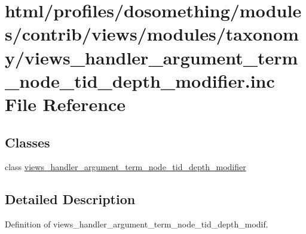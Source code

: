 \hypertarget{views__handler__argument__term__node__tid__depth__modifier_8inc}{
\section{html/profiles/dosomething/modules/contrib/views/modules/taxonomy/views\_\-handler\_\-argument\_\-term\_\-node\_\-tid\_\-depth\_\-modifier.inc File Reference}
\label{views__handler__argument__term__node__tid__depth__modifier_8inc}
}
\subsection*{Classes}
\begin{DoxyCompactItemize}
\item 
class \hyperlink{classviews__handler__argument__term__node__tid__depth__modifier}{views\_\-handler\_\-argument\_\-term\_\-node\_\-tid\_\-depth\_\-modifier}
\end{DoxyCompactItemize}


\subsection{Detailed Description}
Definition of views\_\-handler\_\-argument\_\-term\_\-node\_\-tid\_\-depth\_\-modif. 